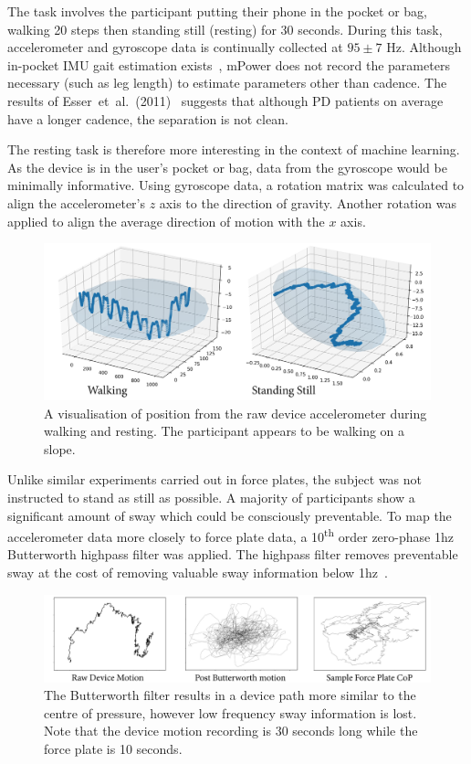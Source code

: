 \documentclass[12pt, twoside]{book}
\renewcommand\emph[1]{\textit{\color{USred}{#1}}}
\begin{document}
The \emph{walking} task involves the participant putting their phone in the pocket or bag, walking 20 steps then standing still (resting) for 30 seconds. During this task, accelerometer and gyroscope data is continually collected at $95\pm7$ Hz. Although in-pocket IMU gait estimation exists~\cite{diaz2014step}, mPower does not record the parameters necessary (such as leg length) to estimate parameters other than cadence. The results of Esser~et~al.~(2011)~\cite{esser2011assessment} suggests that although PD patients on average have a longer cadence, the separation is not clean.

The resting task is therefore more interesting in the context of machine learning. As the device is in the user's pocket or bag, data from the gyroscope would be minimally informative. Using gyroscope data, a rotation matrix was calculated to align the accelerometer's $z$ axis to the direction of gravity. Another rotation was applied to align the average direction of motion with the $x$ axis.

\begin{figure}[h]
\label{mpowerwalking}
\centering\includegraphics[width=0.9\linewidth]{pathvis3d.png}
\caption{A visualisation of position from the raw device accelerometer during walking and resting. The participant appears to be walking on a slope.}
\end{figure}

Unlike similar experiments carried out in force plates, the subject was not instructed to stand as still as possible. A majority of participants show a significant amount of sway which could be consciously preventable. To map the accelerometer data more closely to force plate data, a 10\textsuperscript{th} order zero-phase 1hz Butterworth highpass filter was applied. The highpass filter removes preventable sway at the cost of removing valuable sway information below 1hz~\cite{swayspectral}. 

\begin{figure}[h]
	\label{butterworth}
	\centering\centerline{\includegraphics[width=1.2\linewidth]{butterworth.png}}
	\caption{The Butterworth filter results in a device path more similar to the centre of pressure, however low frequency sway information is lost. Note that the device motion recording is 30 seconds long while the force plate is 10 seconds.}
\end{figure}
\end{document}
